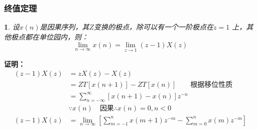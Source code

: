 \documentclass[notheorems,compress,mathserif,table]{beamer}
\newtheorem{dablock}{}
\newtheorem{daproof}{证明}
\begin{document}
\begin{frame}[shrink]\frametitle{终值定理}%
\begin{dablock}
\quad 设$x(n)$是因果序列，其$Z$变换的极点，除可以有一个一阶极点在$z=1$ 上，其他极点都在单位园内，则：
$$\lim_{n\rightarrow \infty}x(n) = \lim_{z\rightarrow 1}(z-1)X(z)$$
\end{dablock}
\textbf{证明：}
\begin{equation*}
\begin{split}
(z-1)X(z) &= zX(z) -X(z) \\
&= ZT[x(n+1)] - ZT[x(n)]\quad\quad\mbox{根据移位性质}\\
&= \sum_{n=-\infty}^{\infty}[x(n+1)-x(n)]z^{-n}  \\
&  \because  x(n)\quad\mbox{因果} \therefore x(n)=0,n<0  \\
(z-1)X(z) &= \lim_{n\rightarrow \infty}\left[\sum_{m=-1}^{n}x(m+1)z^{-m}- \sum_{m=0}^{n}x(m)z^{-m}\right]\\
\end{split}
\end{equation*}
\end{frame}
\end{document}
